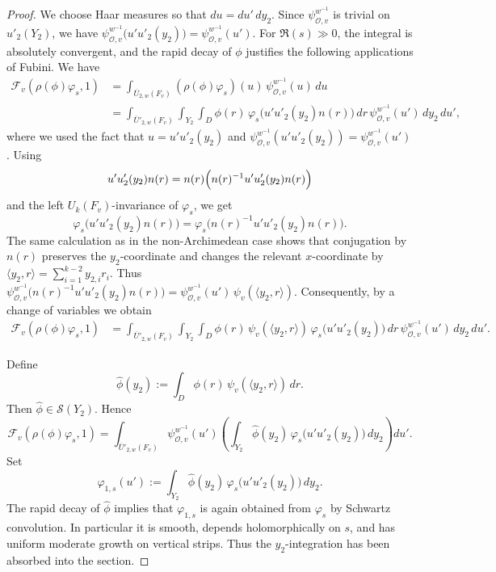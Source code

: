 \documentclass[11pt,notitlepage]{amsart}
\theoremstyle{definition}
\theoremstyle{remark}
\newcommand{\calF}{\mathcal{F}}
\newcommand{\calO}{\mathcal{O}}
\begin{document}
\begin{proof}
We choose Haar measures so that \(du=du'\,dy_2\). Since
\(\psi^{w^{-1}}_{\calO,v}\) is trivial on \(u'_2(Y_2)\), we have
  $\psi^{w^{-1}}_{\calO,v}\bigl(u'u'_2(y_2)\bigr)
  =
  \psi^{w^{-1}}_{\calO,v}(u')$. For \(\Re(s)\gg0\), the integral is absolutely convergent, and the rapid decay of
\(\phi\) justifies the following applications of Fubini. We have
\begin{align*}
  \calF_v(\rho(\phi)\varphi_s,1)
  &=
  \int_{\overline U_{2,w}(F_v)}
    (\rho(\phi)\varphi_s)(u)\,
    \psi^{w^{-1}}_{\calO,v}(u)\,du                                     \\
  &=
  \int_{\overline U'_{2,w}(F_v)}
  \int_{Y_2}
  \int_D
    \phi(r)\,
    \varphi_s\!\bigl(u'u'_2(y_2)n(r)\bigr)\,
    dr\,
    \psi^{w^{-1}}_{\calO,v}(u')\,dy_2\,du',
\end{align*}
where we used the fact that $u=u'u'_2(y_2)$ and $\psi^{w^{-1}}_{\calO,v}(u'u'_2(y_2))=\psi^{w^{-1}}_{\calO,v}(u')$. Using
\[
  u'u'_2(y_2)n(r)
  =
  n(r)\Bigl(n(r)^{-1}u'u'_2(y_2)n(r)\Bigr)
\]
and the left \(U_k(F_v)\)-invariance of \(\varphi_s\), we get
\[
  \varphi_s\!\bigl(u'u'_2(y_2)n(r)\bigr)
  =
  \varphi_s\!\bigl(n(r)^{-1}u'u'_2(y_2)n(r)\bigr).
\]
The same calculation as in the non-Archimedean case shows that
conjugation by \(n(r)\) preserves the \(y_2\)-coordinate and changes the relevant
\(x\)-coordinate by $\langle y_2,r\rangle=\sum_{i=1}^{k-2}y_{2,i}r_i$. Thus
  $\psi^{w^{-1}}_{\calO,v}
  \bigl(n(r)^{-1}u'u'_2(y_2)n(r)\bigr)
  =
  \psi^{w^{-1}}_{\calO,v}(u')\,
  \psi_v(\langle y_2,r\rangle)$. Consequently, by a change of variables we obtain
\begin{align*}
  \calF_v(\rho(\phi)\varphi_s,1)
  &=
  \int_{\overline U'_{2,w}(F_v)}
  \int_{Y_2}
  \int_D
    \phi(r)\,
    \psi_v(\langle y_2,r\rangle)\,
    \varphi_s\!\bigl(u'u'_2(y_2)\bigr)\,
    dr\,
    \psi^{w^{-1}}_{\calO,v}(u')\,dy_2\,du' .
\end{align*}

Define
\[
  \widehat\phi(y_2)
  :=
  \int_D \phi(r)\,\psi_v(\langle y_2,r\rangle)\,dr .
\]
Then \(\widehat\phi\in\mathcal S(Y_2)\). Hence
\[
  \calF_v(\rho(\phi)\varphi_s,1)
  =
  \int_{\overline U'_{2,w}(F_v)}
    \psi^{w^{-1}}_{\calO,v}(u')
    \left(
      \int_{Y_2}
        \widehat\phi(y_2)\,
        \varphi_s\!\bigl(u'u'_2(y_2)\bigr)\,dy_2
    \right)
  du' .
\]
Set
\[
  \varphi_{1,s}(u')
  :=
  \int_{Y_2}
    \widehat\phi(y_2)\,
    \varphi_s\!\bigl(u'u'_2(y_2)\bigr)\,dy_2 .
\]
The rapid decay of \(\widehat\phi\) implies that \(\varphi_{1,s}\) is again obtained
from \(\varphi_s\) by Schwartz convolution. In particular it is smooth, depends
holomorphically on \(s\), and has uniform moderate growth on vertical strips. Thus
the \(y_2\)-integration has been absorbed into the section.


\end{proof}
\end{document}
